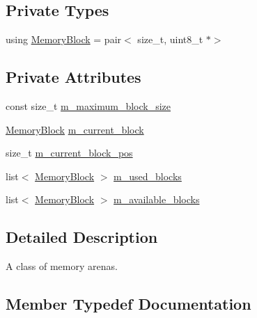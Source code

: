 \subsection*{Private Types}
\begin{DoxyCompactItemize}
\item 
using \hyperlink{classmage_1_1_memory_arena_af41064ba5e850e5541873b3c8acb5067}{Memory\+Block} = pair$<$ size\+\_\+t, uint8\+\_\+t $\ast$$>$
\end{DoxyCompactItemize}
\subsection*{Private Attributes}
\begin{DoxyCompactItemize}
\item 
const size\+\_\+t \hyperlink{classmage_1_1_memory_arena_aeef4c56cf50fd3cbbba2879fcd028b86}{m\+\_\+maximum\+\_\+block\+\_\+size}
\item 
\hyperlink{classmage_1_1_memory_arena_af41064ba5e850e5541873b3c8acb5067}{Memory\+Block} \hyperlink{classmage_1_1_memory_arena_a2680b25146c174ac7fd639f1bd0acc7c}{m\+\_\+current\+\_\+block}
\item 
size\+\_\+t \hyperlink{classmage_1_1_memory_arena_a880d07eb372ce1c8b907947fcbdfc59c}{m\+\_\+current\+\_\+block\+\_\+pos}
\item 
list$<$ \hyperlink{classmage_1_1_memory_arena_af41064ba5e850e5541873b3c8acb5067}{Memory\+Block} $>$ \hyperlink{classmage_1_1_memory_arena_a37891872cff5b86bb1f9c40b4450b904}{m\+\_\+used\+\_\+blocks}
\item 
list$<$ \hyperlink{classmage_1_1_memory_arena_af41064ba5e850e5541873b3c8acb5067}{Memory\+Block} $>$ \hyperlink{classmage_1_1_memory_arena_a74c0d5d40bb402ec52bb23b7ccb9fec5}{m\+\_\+available\+\_\+blocks}
\end{DoxyCompactItemize}


\subsection{Detailed Description}
A class of memory arenas. 

\subsection{Member Typedef Documentation}
\hypertarget{classmage_1_1_memory_arena_af41064ba5e850e5541873b3c8acb5067}{}\label{classmage_1_1_memory_arena_af41064ba5e850e5541873b3c8acb5067} 
